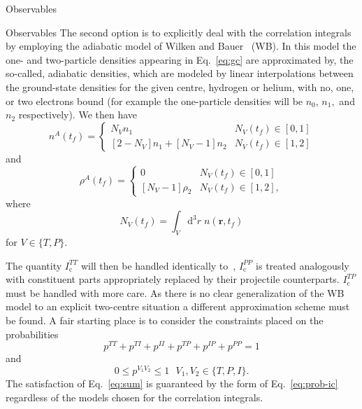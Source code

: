 \documentclass[letterpaper, 11 pt]{report}
\begin{document}
\begin{chapter}{Observables \label{chap:p-he2p-he}}
\begin{section}{Observables \label{sec:phe2p-obs}}
      The second option is to explicitly deal with the correlation integrals by employing the adiabatic
      model of Wilken and Bauer~\cite{wb} (WB). In this model the one- and two-particle densities
      appearing in Eq.~\eqref{eq:gc} are approximated by, the so-called, adiabatic densities, which are
      modeled by linear interpolations between the ground-state densities for the given centre, hydrogen
      or helium, with no, one, or two electrons bound (for example the one-particle densities will be
      $n_0$, $ n_1,$ and $n_2$ respectively). We then have
      \begin{equation} \label{eq:n1a}
         n^{A} (t_f) = \begin{cases}
         N_V n_1 & N_V(t_f) \in [0,1] \\
         \left[ 2-N_V \right] n_1 + \left[ N_V-1 \right] n_2 & N_V(t_f) \in [1,2]
         \end{cases}
      \end{equation}
      and
      \begin{equation} \label{eq:p2a}
         \rho^{A} (t_f) =
         \begin{cases}
            0 & N_V(t_f) \in [0,1] \\
            \left[ N_V-1 \right] \rho_2 & N_V(t_f) \in [1,2],
         \end{cases}
      \end{equation}
      where
      \begin{equation} \label{eq:Nv}
         N_V(t_f) = \int_V \mathrm{d}^3 r \; n(\mathbf{r},t_f)
      \end{equation}
      for $V \in \{T,P\}$. 

      The quantity $I_\mathrm{c}^{TT}$ will then be handled identically to~\cite{pbarhe},
      $I_\mathrm{c}^{PP}$ is treated analogously with constituent parts appropriately replaced by their
      projectile counterparts. $I_\mathrm{c}^{TP}$ must be handled with more care. As there is no clear
      generalization of the WB model to an explicit two-centre situation a different approximation scheme
      must be found. A fair starting place is to consider the constraints placed on the probabilities
      \begin{equation} \label{eq:sum}
         p^{TT} + p^{TI} + p^{II} + p^{TP} + p^{IP} + p^{PP} = 1
      \end{equation}
      and
      \begin{equation} \label{eq:bound}
         0 \leq p^{V_1 V_2} \leq 1 ~ ~ ~ V_1, V_2 \in\{ T,P,I\}.
      \end{equation}
      The satisfaction of Eq.~\eqref{eq:sum} is guaranteed by the form of Eq.~\eqref{eq:prob-ic}
      regardless of the models chosen for the correlation integrals.


\end{section}
\end{chapter}
\end{document}
